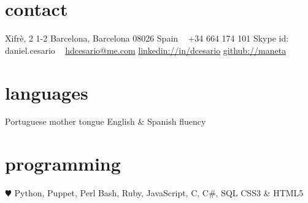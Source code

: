 \documentclass[]{friggeri-cv} %
\begin{document}


\begin{aside} %
\section{contact}
Xifrè, 2 1-2
Barcelona, Barcelona 08026
Spain
~
+34 664 174 101
Skype id: daniel.cesario
~
\href{mailto:hdcesario@me.com}{hdcesario@me.com}
\href{http://es.linkedin.com/in/dcesario/}{linkedin://in/dcesario}
\href{https://github.com/maneta}{github://maneta}
\section{languages}
Portuguese mother tongue
English \& Spanish fluency
\section{programming}
{\color{red} $\varheartsuit$} Python, Puppet, Perl 
Bash, Ruby, JavaScript, C, C\#, SQL 
CSS3 \& HTML5
\end{aside}

\end{document}
